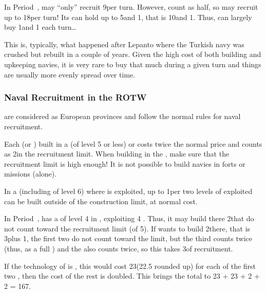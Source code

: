 \begin{exemple}[Galleys]
  In Period~, \TUR may ``only'' recruit 9\ND per turn. However,
  \NGD count as half, so \TUR may recruit up to 18\NGD per turn! Its
  \FLEET\Faceplus can hold up to 5\ND and 1\NTD, that is 10\NGD and
  1\NTD. Thus, \TUR can largely buy 1\FLEET\Faceplus and 1\FLEET\Facemoins
  each turn\ldots

  This is, typically, what happened after Lepanto where the Turkish navy was
  crushed but rebuilt in a couple of years. Given the high cost of both
  building and upkeeping navies, it is very rare to buy that much \ND during a
  given turn and things are usually more evenly spread over time.
\end{exemple}

\subsubsection{Naval Recruitment in the ROTW}
 are considered as European provinces and follow the
normal rules for naval recruitment.

 Each \ND (or \NTD) built in a \COL (of level
5 or less) or \TP costs twice the normal price and counts as 2\ND in the
recruitment limit.
\bparag When building \FLEET\Facemoins in the \ROTW, make sure that the
recruitment limit is high enough!
\bparag It is not possible to build navies in forts or missions (alone).

\aparag[Fisheries]\label{chLogistic:Effect of Fish Purchase} In a \COL
(including of level 6) where  is exploited, up to 1\NDE per two
levels of  exploited can be built outside of the construction limit,
at normal cost.

\begin{exemple}
  In Period~, \FRA has a \COL of level 4 in
  , exploiting 4 . Thus, it may build
  there 2\NDE that do not count toward the recruitment limit (of 5\ND). If
  \FRA wants to build 2\ND there, that is 3\NDE plus 1\ND, the first two \NDE
  do not count toward the limit, but the third counts twice (thus, as a full
  \ND) and the \ND also counts twice, so this takes 3\ND of recruitment.

  If the technology of \FRA is \TBAT, this would cost 23\ducats (22.5 rounded
  up) for each of the first two \NDE, then the cost of the rest is
  doubled. This brings the total to 23 + 23 + 2  + 2
   = 167\ducats.
\end{exemple}

